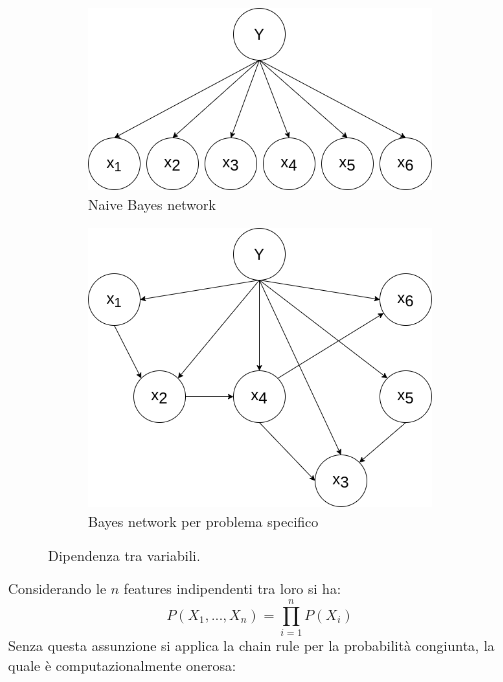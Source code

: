 \documentclass[oneside]{book}
\begin{document}
\begin{figure}[!h]
	\centering
	\begin{subfigure}[b]{0.4\textwidth}
		\centering
		\includegraphics[width=\linewidth]{assets/naive-bayes.png}
		\caption{Naive Bayes network}
		\label{fig:naive-bayes}
	\end{subfigure}
	\hfill
	\begin{subfigure}[b]{0.4\textwidth}
	\centering
		\includegraphics[width=\linewidth]{assets/bayes-network.png}
		\caption{Bayes network per problema specifico}
		\label{fig:naive-bayes}
	\end{subfigure}
	\caption{Dipendenza tra variabili.}
\end{figure}
\noindent Considerando le $n$ features indipendenti tra loro si ha:
$$P(X_1, ..., X_n) = \prod\limits_{i=1}^{n}P(X_i) $$
Senza questa assunzione si applica la chain rule per la probabilità congiunta, la quale è computazionalmente onerosa:
\end{document}
